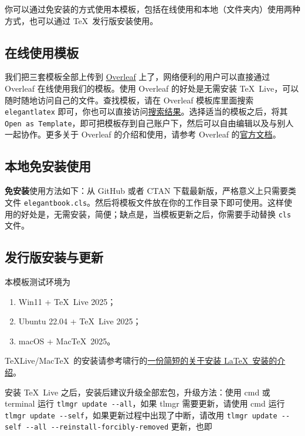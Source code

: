\documentclass[lang=cn,newtx,10pt,scheme=chinese]{elegantbook}
\begin{document}
你可以通过免安装的方式使用本模板，包括在线使用和本地（文件夹内）使用两种方式，也可以通过 \TeX\ 发行版安装使用。

\subsection{在线使用模板}

我们把三套模板全部上传到 \href{https://www.overleaf.com/}{Overleaf} 上了，网络便利的用户可以直接通过 Overleaf 在线使用我们的模板。使用 Overleaf 的好处是无需安装 \TeX~Live，可以随时随地访问自己的文件。查找模板，请在 Overleaf 模板库里面搜索 \lstinline{elegantlatex} 即可，你也可以直接访问\href{https://www.overleaf.com/latex/templates?addsearch=elegantlatex}{搜索结果}。选择适当的模板之后，将其 \lstinline{Open as Template}，即可把模板存到自己账户下，然后可以自由编辑以及与别人一起协作。更多关于 Overleaf 的介绍和使用，请参考 Overleaf 的\href{https://www.overleaf.com/learn}{官方文档}。

\subsection{本地免安装使用}

\textbf{免安装}使用方法如下：从 GitHub 或者 CTAN 下载最新版，严格意义上只需要类文件 \lstinline{elegantbook.cls}。然后将模板文件放在你的工作目录下即可使用。这样使用的好处是，无需安装，简便；缺点是，当模板更新之后，你需要手动替换 \lstinline{cls} 文件。

\subsection{发行版安装与更新}

本模板测试环境为 
\begin{enumerate}
  \item Win11 + \TeX~Live 2025；
  \item Ubuntu 22.04 + \TeX~Live 2025；
  \item macOS + Mac\TeX\ 2025。
\end{enumerate}

\TeX Live/Mac\TeX\ 的安装请参考啸行的\href{https://github.com/OsbertWang/install-latex-guide-zh-cn/releases/}{一份简短的关于安装 \LaTeX\ 安装的介绍}。

安装 \TeX~Live 之后，安装后建议升级全部宏包，升级方法：使用 cmd 或 terminal 运行 \lstinline{tlmgr update --all}，如果 tlmgr 需要更新，请使用 cmd 运行 \lstinline{tlmgr update --self}，如果更新过程中出现了中断，请改用 \lstinline{tlmgr update --self --all --reinstall-forcibly-removed} 更新，也即
\end{document}
